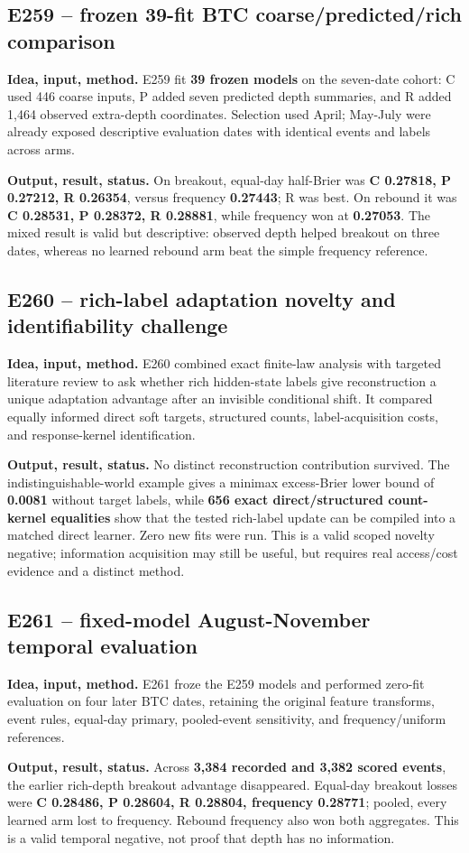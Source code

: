 \documentclass[10pt,a4paper]{article}
\begin{document}
\subsection{E259 -- frozen 39-fit BTC coarse/predicted/rich comparison}
\textbf{Idea, input, method.} E259 fit \textbf{39 frozen models} on the seven-date cohort: C used 446 coarse inputs, P added seven predicted depth summaries, and R added 1,464 observed extra-depth coordinates. Selection used April; May-July were already exposed descriptive evaluation dates with identical events and labels across arms.\par
\textbf{Output, result, status.} On breakout, equal-day half-Brier was \textbf{C 0.27818, P 0.27212, R 0.26354}, versus frequency \textbf{0.27443}; R was best. On rebound it was \textbf{C 0.28531, P 0.28372, R 0.28881}, while frequency won at \textbf{0.27053}. The mixed result is valid but descriptive: observed depth helped breakout on three dates, whereas no learned rebound arm beat the simple frequency reference.\par
\subsection{E260 -- rich-label adaptation novelty and identifiability challenge}
\textbf{Idea, input, method.} E260 combined exact finite-law analysis with targeted literature review to ask whether rich hidden-state labels give reconstruction a unique adaptation advantage after an invisible conditional shift. It compared equally informed direct soft targets, structured counts, label-acquisition costs, and response-kernel identification.\par
\textbf{Output, result, status.} No distinct reconstruction contribution survived. The indistinguishable-world example gives a minimax excess-Brier lower bound of \textbf{0.0081} without target labels, while \textbf{656 exact direct/structured count-kernel equalities} show that the tested rich-label update can be compiled into a matched direct learner. Zero new fits were run. This is a valid scoped novelty negative; information acquisition may still be useful, but requires real access/cost evidence and a distinct method.\par
\subsection{E261 -- fixed-model August-November temporal evaluation}
\textbf{Idea, input, method.} E261 froze the E259 models and performed zero-fit evaluation on four later BTC dates, retaining the original feature transforms, event rules, equal-day primary, pooled-event sensitivity, and frequency/uniform references.\par
\textbf{Output, result, status.} Across \textbf{3,384 recorded and 3,382 scored events}, the earlier rich-depth breakout advantage disappeared. Equal-day breakout losses were \textbf{C 0.28486, P 0.28604, R 0.28804, frequency 0.28771}; pooled, every learned arm lost to frequency. Rebound frequency also won both aggregates. This is a valid temporal negative, not proof that depth has no information.\par
\end{document}
